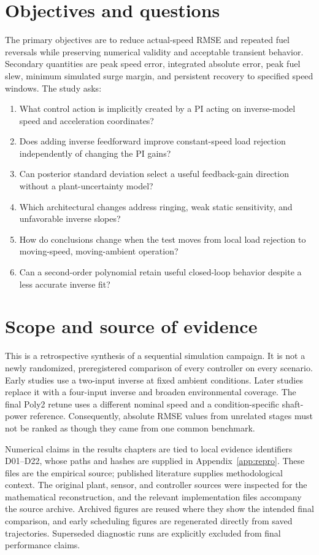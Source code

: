 \section{Objectives and questions}
The primary objectives are to reduce actual-speed RMSE and repeated fuel reversals while preserving numerical validity and acceptable transient behavior. Secondary quantities are peak speed error, integrated absolute error, peak fuel slew, minimum simulated surge margin, and persistent recovery to specified speed windows. The study asks:
\begin{enumerate}
\item What control action is implicitly created by a PI acting on inverse-model speed and acceleration coordinates?
\item Does adding inverse feedforward improve constant-speed load rejection independently of changing the PI gains?
\item Can posterior standard deviation select a useful feedback-gain direction without a plant-uncertainty model?
\item Which architectural changes address ringing, weak static sensitivity, and unfavorable inverse slopes?
\item How do conclusions change when the test moves from local load rejection to moving-speed, moving-ambient operation?
\item Can a second-order polynomial retain useful closed-loop behavior despite a less accurate inverse fit?
\end{enumerate}

\section{Scope and source of evidence}
This is a retrospective synthesis of a sequential simulation campaign. It is not a newly randomized, preregistered comparison of every controller on every scenario. Early studies use a two-input inverse at fixed ambient conditions. Later studies replace it with a four-input inverse and broaden environmental coverage. The final Poly2 retune uses a different nominal speed and a condition-specific shaft-power reference. Consequently, absolute RMSE values from unrelated stages must not be ranked as though they came from one common benchmark.

Numerical claims in the results chapters are tied to local evidence identifiers D01--D22, whose paths and hashes are supplied in Appendix~\ref{app:repro}. These files are the empirical source; published literature supplies methodological context. The original plant, sensor, and controller sources were inspected for the mathematical reconstruction, and the relevant implementation files accompany the source archive. Archived figures are reused where they show the intended final comparison, and early scheduling figures are regenerated directly from saved trajectories. Superseded diagnostic runs are explicitly excluded from final performance claims.

